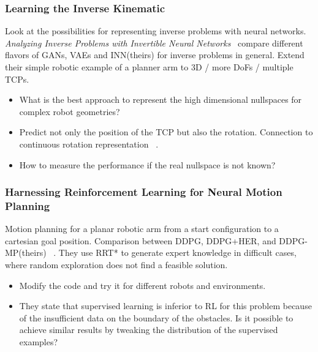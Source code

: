 \documentclass[a4paper]{article}
\begin{document}

\subsubsection{Learning the Inverse Kinematic}
Look at the possibilities for representing inverse problems with neural networks.
\textit{Analyzing Inverse Problems with Invertible Neural Networks}~\cite{Ardizzone2018}
compare different flavors of GANs, VAEs and INN(theirs) for inverse problems in general. Extend their simple robotic example of a planner arm to 3D / more DoFs / multiple TCPs.
\begin{itemize}
  \item What is the best approach to represent the high dimensional nullspaces for complex robot geometries?
  \item Predict not only the position of the TCP but also the rotation. Connection to continuous rotation representation ~\cite{Zhou2018}.
  \item How to measure the performance if the real nullspace is not known?
\end{itemize}

\subsubsection{Harnessing Reinforcement Learning for Neural Motion Planning}
Motion planning for a planar robotic arm from a start configuration to a cartesian goal position. Comparison between DDPG, DDPG+HER, and DDPG-MP(theirs) ~\cite{Jurgenson2019}.
They use RRT* to generate expert knowledge in difficult cases, where random exploration does not find a feasible solution.
\begin{itemize}
  \item Modify the code and try it for different robots and environments.
  \item They state that supervised learning is inferior to RL for this problem because of the insufficient data on the boundary of the obstacles. Is it possible to achieve similar results by tweaking the distribution of the supervised examples?
\end{itemize}
\end{document}

